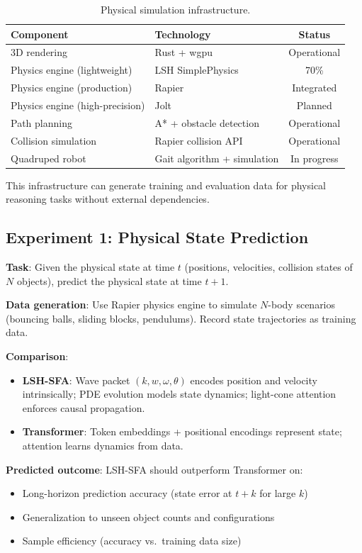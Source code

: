\documentclass{article}
\begin{document}
\begin{table}[h]
\centering
\caption{Physical simulation infrastructure.}
\label{tab:infrastructure}
\begin{tabular}{llc}
\toprule
\textbf{Component} & \textbf{Technology} & \textbf{Status} \\
\midrule
3D rendering & Rust + wgpu & Operational \\
Physics engine (lightweight) & LSH SimplePhysics & 70\% \\
Physics engine (production) & Rapier & Integrated \\
Physics engine (high-precision) & Jolt & Planned \\
Path planning & A* + obstacle detection & Operational \\
Collision simulation & Rapier collision API & Operational \\
Quadruped robot & Gait algorithm + simulation & In progress \\
\end{tabular}
\end{table}

This infrastructure can generate training and evaluation data for physical reasoning tasks without external dependencies.

\subsection{Experiment 1: Physical State Prediction}

\textbf{Task}: Given the physical state at time $t$ (positions, velocities, collision states of $N$ objects), predict the physical state at time $t+1$.

\textbf{Data generation}: Use Rapier physics engine to simulate $N$-body scenarios (bouncing balls, sliding blocks, pendulums). Record state trajectories as training data.

\textbf{Comparison}:
\begin{itemize}
\item \textbf{LSH-SFA}: Wave packet $(k, w, \omega, \theta)$ encodes position and velocity intrinsically; PDE evolution models state dynamics; light-cone attention enforces causal propagation.
\item \textbf{Transformer}: Token embeddings + positional encodings represent state; attention learns dynamics from data.
\end{itemize}

\textbf{Predicted outcome}: LSH-SFA should outperform Transformer on:
\begin{itemize}
\item Long-horizon prediction accuracy (state error at $t+k$ for large $k$)
\item Generalization to unseen object counts and configurations
\item Sample efficiency (accuracy vs.\ training data size)
\end{itemize}
\end{document}
